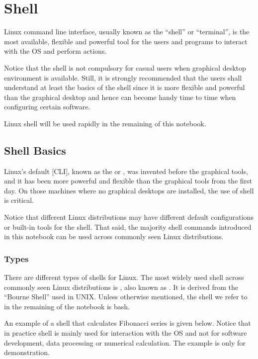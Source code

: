 \chapter{Shell} \label{ch:sb}

Linux command line interface, usually known as the ``shell'' or ``terminal'', is the most available, flexible and powerful tool for the users and programs to interact with the OS and perform actions.

Notice that the shell is not compulsory for casual users when graphical desktop environment is available. Still, it is strongly recommended that the users shall understand at least the basics of the shell since it is more flexible and powerful than the graphical desktop and hence can become handy time to time when configuring certain software.

Linux shell will be used rapidly in the remaining of this notebook.

\section{Shell Basics}

Linux's default [CLI], known as the  or , was invented before the graphical tools, and it has been more powerful and flexible than the graphical tools from the first day. On those machines where no graphical desktops are installed, the use of shell is critical.

Notice that different Linux distributions may have different default configurations or built-in tools for the shell. That said, the majority shell commands introduced in this notebook can be used across commonly seen Linux distributions.

\subsection{Types}

There are different types of shells for Linux. The most widely used shell across commonly seen Linux distributions is , also known as . It is derived from the ``Bourne Shell'' used in UNIX. Unless otherwise mentioned, the shell we refer to in the remaining of the notebook is bash. 

An example of a shell that calculates Fibonacci series is given below. Notice that in practice shell is mainly used for interaction with the OS and not for software development, data processing or numerical calculation. The example is only for demonstration.

